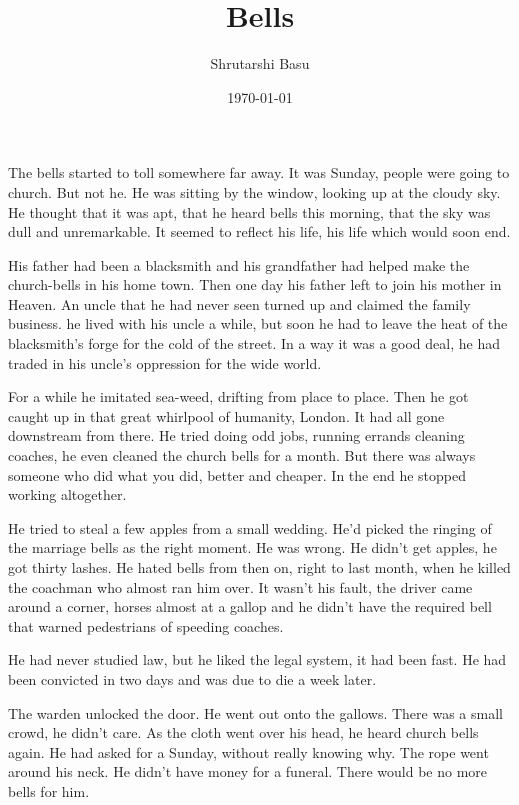 \documentclass[11pt,letterpaper]{article}
\title{Bells}
\author{Shrutarshi Basu}
\date{\today}
\begin{document}
\maketitle
\doublespacing

The bells started to toll somewhere far away. It was Sunday, people were going to church. But not he. He was sitting by the window, looking up at the cloudy sky. He thought that it was apt, that he heard bells this morning, that the sky was dull and unremarkable. It seemed to reflect his life, his life which would soon end.

His father had been a blacksmith and his grandfather had helped make the church-bells in his home town. Then one day his father left to join his mother in Heaven. An uncle that he had never seen turned up and claimed the family business. he lived with his uncle a while, but soon he had to leave the heat of the blacksmith's forge for the cold of the street. In a way it was a good deal, he had traded in his uncle's oppression for the wide world.

For a while he imitated sea-weed, drifting from place to place. Then he got caught up in that great whirlpool of humanity, London. It had all gone downstream from there. He tried doing odd jobs, running errands cleaning coaches, he even cleaned the church bells for a month. But there was always someone who did what you did, better and cheaper. In the end he stopped working altogether.

He tried to steal a few apples from a small wedding. He'd picked the ringing of the marriage bells as the right moment. He was wrong. He didn't get apples, he got thirty lashes. He hated bells from then on, right to last month, when he killed the coachman who almost ran him over. It wasn't his fault, the driver came around a corner, horses almost at a gallop and he didn't have the required bell that warned pedestrians of speeding coaches.

He had never studied law, but he liked the legal system, it had been fast. He had been convicted in two days and was due to die a week later.

The warden unlocked the door. He went out onto the gallows. There was a small crowd, he didn't care. As the cloth went over his head, he heard church bells again. He had asked for a Sunday, without really knowing why. The rope went around his neck. He didn't have money for a funeral. There would be no more bells for him. 

\end{document}
